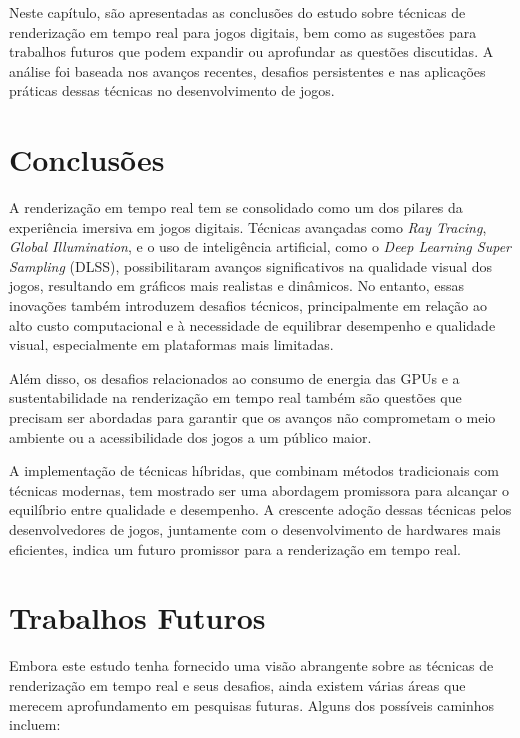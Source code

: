 \makeatletter
\renewcommand{\chapter}{%
  \if@openright\cleardoublepage\else\clearpage\fi %
  \secdef{\@chapter}{\@schapter}}
\makeatother
\chapter{Conclusão e Trabalhos Futuros}

Neste capítulo, são apresentadas as conclusões do estudo sobre técnicas de renderização em tempo real para jogos digitais, bem como as sugestões para trabalhos futuros que podem expandir ou aprofundar as questões discutidas. A análise foi baseada nos avanços recentes, desafios persistentes e nas aplicações práticas dessas técnicas no desenvolvimento de jogos.

\section{Conclusões}
A renderização em tempo real tem se consolidado como um dos pilares da experiência imersiva em jogos digitais. Técnicas avançadas como \textit{Ray Tracing}, \textit{Global Illumination}, e o uso de inteligência artificial, como o \textit{Deep Learning Super Sampling} (DLSS), possibilitaram avanços significativos na qualidade visual dos jogos, resultando em gráficos mais realistas e dinâmicos. No entanto, essas inovações também introduzem desafios técnicos, principalmente em relação ao alto custo computacional e à necessidade de equilibrar desempenho e qualidade visual, especialmente em plataformas mais limitadas.

Além disso, os desafios relacionados ao consumo de energia das GPUs e a sustentabilidade na renderização em tempo real também são questões que precisam ser abordadas para garantir que os avanços não comprometam o meio ambiente ou a acessibilidade dos jogos a um público maior.

A implementação de técnicas híbridas, que combinam métodos tradicionais com técnicas modernas, tem mostrado ser uma abordagem promissora para alcançar o equilíbrio entre qualidade e desempenho. A crescente adoção dessas técnicas pelos desenvolvedores de jogos, juntamente com o desenvolvimento de hardwares mais eficientes, indica um futuro promissor para a renderização em tempo real.

\section{Trabalhos Futuros}
Embora este estudo tenha fornecido uma visão abrangente sobre as técnicas de renderização em tempo real e seus desafios, ainda existem várias áreas que merecem aprofundamento em pesquisas futuras. Alguns dos possíveis caminhos incluem:

